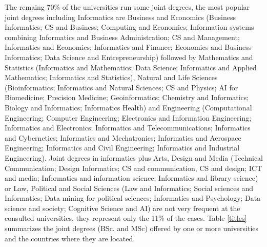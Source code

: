 The remaing 70\% of the universities run some joint degrees, the most popular joint degrees including Informatics are  Business and Economics (Business Informatics; CS and Business; Computing and Economics; Information systems combining Informatics and Business Administration; CS and Management; Informatics and Economics; Informatics and Finance; Economics and Business Informatics; Data Science and Entrepreneurship) followed by Mathematics and Statistics (Informatics and Mathematics; Data Science; Informatics and Applied Mathematics; Informatics and Statistics), Natural and Life Sciences (Bioinformatics; Informatics and Natural Sciences; CS and Physics; AI for Biomedicine; Precision Medicine; Geoinformatics; Chemistry and Informatics; Biology and Informatics; Informatics Health) and Engineering (Computational Engineering; Computer Engineering; Electronics and Information Engineering; Informatics and Electronics; Informatics and Telecommunications; Informatics and Cybernetics; Informatics and Mechatronics; Informatics and Aerospace Engineering; Informatics and Civil Engineering; Informatics and Industrial Engineering). Joint degrees in informatics plus Arts, Design and Media (Technical Communication; Design Informatics; CS and communication, CS and design; ICT and media; Informatics and information science; Informatics and library science) or Law, Political and Social Sciences (Law and Informatics; Social sciences and Informatics; Data mining for political sciences; Informatics and Psychology; Data science and society; Cognitive Science and AI) are not very frequent at the consulted universities, they represent only the 11\% of the cases. Table \ref{titles} summarizes  the joint degrees (BSc. and MSc) offered by one or more universities and the countries where they are located.

